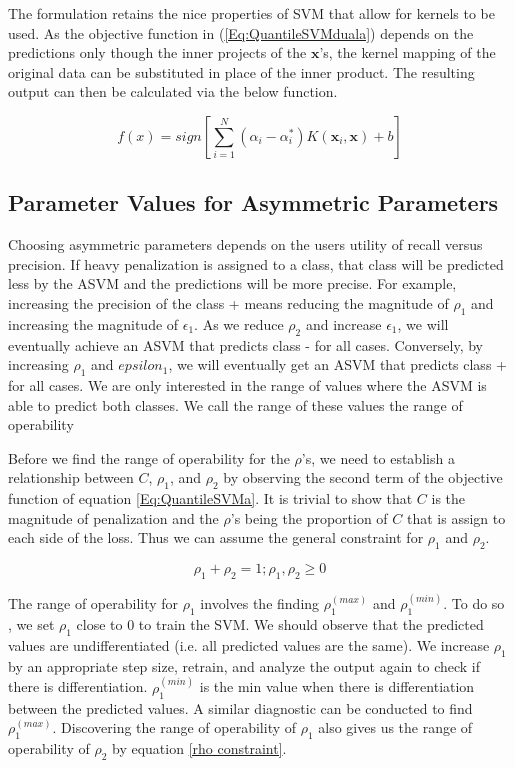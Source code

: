 \documentclass[twoside,11pt]{article}
\begin{document}
The formulation retains the nice properties of SVM that allow for kernels to be used. As the objective function in (\ref{Eq:QuantileSVMduala}) depends on the predictions only though the inner projects of the $\mathbf{x}$'s, the kernel mapping of the original data can be substituted in place of the inner product. The resulting output can then be calculated via the below function. 

\begin{equation}\label{finalpredictioneqn2}
f(x)=sign[\displaystyle\sum_{i=1}^N (\alpha_i - \alpha_i^*)K(\mathbf{x}_i,\mathbf{x})+b]
\end{equation}

\subsection{Parameter Values for Asymmetric Parameters}
Choosing asymmetric parameters depends on the users utility of recall versus precision. If heavy penalization is assigned to a class, that class will be predicted less by the ASVM and the predictions will be more precise. For example, increasing the precision of the class + means reducing the magnitude of $\rho_1$ and increasing the magnitude of $\epsilon_1$. As we reduce $\rho_2$ and increase $\epsilon_1$, we will eventually achieve an ASVM that predicts class - for all cases. Conversely, by increasing $\rho_1$ and $epsilon_1$, we will eventually get an ASVM that predicts class + for all cases. We are only interested in the range of values where the ASVM is able to predict both classes. We call the range of these values the range of operability 

 Before we find the range of operability for the $\rho$'s, we need to establish a relationship between $C$, $\rho_1$, and $\rho_2$ by observing the second term of the objective function of equation \ref{Eq:QuantileSVMa}. It is trivial to show that $C$ is the magnitude of penalization and the $\rho$'s being the proportion of $C$ that is assign to each side of the loss. Thus we can assume the general constraint for $\rho_1$ and $\rho_2$.

\begin{equation}\label{rho constraint}
\rho_1 + \rho_2 =1; \rho_1,\rho_2 \geq 0
\end{equation}

The range of operability for $\rho_1$ involves the finding $\rho_1^{(max)}$ and $\rho_1^{(min)}$. To do so , we set $\rho_1$ close to 0 to train the SVM. We should observe that the predicted values are undifferentiated (i.e. all predicted values are the same). We increase $\rho_1$ by an appropriate step size, retrain, and analyze the output again to check if there is differentiation. $\rho_1^{(min)}$ is the min value when there is differentiation between the predicted values. A similar diagnostic can be conducted to find $\rho_1^{(max)}$. Discovering the range of operability of $\rho_1$ also gives us the range of operability of $\rho_2$ by equation \ref{rho constraint}.
\end{document}
